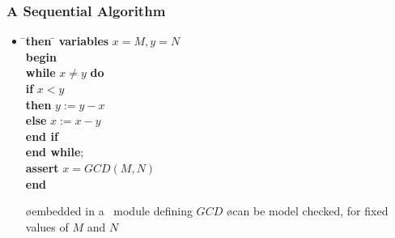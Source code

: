\documentclass[fleqn]{beamer}
\begin{document}
\begin{frame}
  \frametitle{A Sequential Algorithm}

  \begin{itemize}
  \item {}

    \bigskip

    \hspace*{4em}
    \begin{minipage}{.5\linewidth}\small
    \begin{tabbing}
      \quad\=\quad\=\textbf{then }\=\kill
      \textbf{variables} $x = M, y = N$\\
      \textbf{begin}\\
      \> \textbf{while} $x \neq y$ \textbf{do}\\
      \>\> \textbf{if} $x<y$\\
      \>\> \textbf{then}\> $y := y-x$\\
      \>\> \textbf{else}\> $x := x-y$\\
      \>\> \textbf{end if}\\
      \> \textbf{end while};\\
      \> \textbf{assert} $x = GCD(M,N)$\\
      \textbf{end}
    \end{tabbing}
    \end{minipage}

  \oo {}

    \begin{itemize}
    \o embedded in a \tlaplus\ module defining $GCD$
    \o can be model checked, for fixed values of $M$ and $N$
    \end{itemize}
  \end{itemize}
\end{frame}
\end{document}
